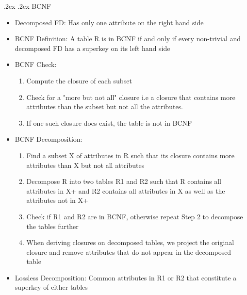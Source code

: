 \documentclass[10pt,landscape,a4paper]{scrartcl}
\makeatletter
\renewcommand{\section}{\@startsection{section}{1}{0mm}%
  {.2ex}%
  {.2ex}%
{\color{myblue}\sffamily\small\bfseries}}
\makeatother
\begin{document}
\begin{multicols*}{4}
  \section{BCNF}
   \begin{itemize}
       \item Decomposed FD: Has only one attribute on the right hand side
       \item BCNF Definition: A table R is in BCNF if and only if every non-trivial and decomposed FD has a superkey on its left hand side
       \item BCNF Check:
           \begin{enumerate}
                \item Compute the closure of each subset
                \item Check for a "more but not all" closure i.e a closure that contains more attributes than the subset but not all the attributes.
                \item If one such closure does exist, the table is not in BCNF
          \end{enumerate}
       \item BCNF Decomposition:
        \begin{enumerate}
            \item Find a subset X of attributes in R such that its closure contains more attributes than X but not all attributes
            \item Decompose R into two tables R1 and R2 such that R contains all attributes in {X}+ and R2 contains all attributes in X as well as the attributes not in {X}+
            \item Check if R1 and R2 are in BCNF, otherwise repeat Step 2 to decompose the tables further
            \item When deriving closures on decomposed tables, we project the original closure and remove attributes that do not appear in the decomposed table 
        \end{enumerate}
        \item Lossless Decomposition: Common attributes in R1 or R2 that constitute a superkey of either tables
   \end{itemize}

\end{multicols*}
\end{document}

